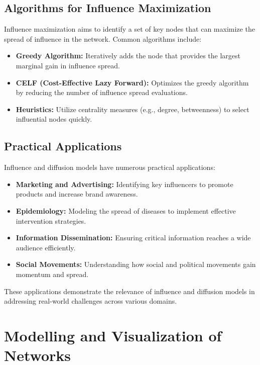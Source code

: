 \documentclass[12pt]{book} %
\begin{document}
\subsection{Algorithms for Influence Maximization}

Influence maximization aims to identify a set of key nodes that can maximize the spread of influence in the network. Common algorithms include:

\begin{itemize}
    \item \textbf{Greedy Algorithm:} Iteratively adds the node that provides the largest marginal gain in influence spread.
    \item \textbf{CELF (Cost-Effective Lazy Forward):} Optimizes the greedy algorithm by reducing the number of influence spread evaluations.
    \item \textbf{Heuristics:} Utilize centrality measures (e.g., degree, betweenness) to select influential nodes quickly.
\end{itemize}

\subsection{Practical Applications}

Influence and diffusion models have numerous practical applications:

\begin{itemize}
    \item \textbf{Marketing and Advertising:} Identifying key influencers to promote products and increase brand awareness.
    \item \textbf{Epidemiology:} Modeling the spread of diseases to implement effective intervention strategies.
    \item \textbf{Information Dissemination:} Ensuring critical information reaches a wide audience efficiently.
    \item \textbf{Social Movements:} Understanding how social and political movements gain momentum and spread.
\end{itemize}

These applications demonstrate the relevance of influence and diffusion models in addressing real-world challenges across various domains.

\section{Modelling and Visualization of Networks}
\end{document}
